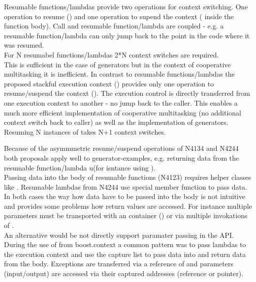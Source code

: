Resumable functions/lambdas provide two operations for context switching. One
operation to resume (\rlop) and one operation to supend the context (\yield
inside the function body). Call and resumable function/lambda are coupled - e.g.
a resumable function/lambda can only jump back to the point in the code where it
was resumed.\\
For N resumabel functions/lambdas 2*N context switches are required.\\
This is sufficient in the case of generators but in the context of cooperative
multitasking it is inefficient.
In contrast to resumable functions/lambdas the proposed stackful execution
context (\ectx) provides only one operation to resume/suspend the context
(\ectxop). The execution control is directly transferred from one
execution context to another - no jump back to the caller. This enables a much
more efficient implementation of cooperative multitasking (no additional context
switch back to caller) as well as the implementation of generators. Resuming N
instances of \ectx takes N+1 context switches.

Because of the asymmmetric resume/suspend operations of N4134 and N4244 both
proposals apply well to generator-examples, e.g. returning data from the
resumable function/lambda u(for isntance using \yield).\\
Passing data into the body of resumable functions (N4123) requires helper
classes like \channel.
Resumable lambdas from N4244 use special member function \rlwanted to pass data.
In both cases the way how data have to be passed into the body is not intuitive
and provides some problems how return values are accessed. For instance multiple
parameters must be transported with an container (\tuple) or via multiple
invokations of \rlwanted.\\
\newline
An alternative would be not directly support paramater passing in the API.\\
During the use of  from boost.context\cite{bcontext} a
common pattern was to pass lambdas to the execution context and use the capture
list to pass data into and return data from the body. Exceptions are transferred
via a reference of \excpt and parameters (input/output) are accessed via their
captured addresses (reference or pointer).

